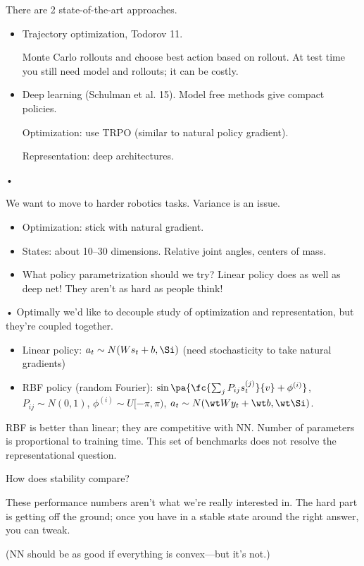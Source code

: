 There are 2 state-of-the-art approaches. 
\begin{itemize}
\item
Trajectory optimization, Todorov 11.

Monte Carlo rollouts and choose best action based on  rollout. At test time you still need model and rollouts; it can be costly.
\item
Deep learning (Schulman et al. 15). Model free methods give compact policies.

Optimization: use TRPO (similar to natural policy gradient).

Representation: deep architectures.
\end{itemize}•

We want to move to harder robotics tasks. Variance is an issue.
\begin{itemize}
\item
Optimization: stick with natural gradient.
\item
States: about 10--30 dimensions. Relative joint angles, centers of mass.
\item
What policy parametrization should we try? Linear policy does as well as deep net! They aren't as hard as people think!
\end{itemize}•
Optimally we'd like to decouple study of optimization and representation, but they're coupled together.

\begin{itemize}
\item
Linear policy: $a_t\sim N(Ws_t+b, \Si)$ (need stochasticity to take natural gradients)
\item
RBF policy (random Fourier): $\sin \pa{\fc{\sum_j P_{ij}s_t^{(j)}}{v} + \phi^{(i)}}$, $P_{ij}\sim N(0,1)$, $\phi^{(i)} \sim U[-\pi, \pi)$,  $a_t\sim N(\wt W y_t+\wt b, \wt \Si)$. 
\end{itemize}
RBF is better than linear; they are competitive with NN. Number of parameters is proportional to training time.  This set of benchmarks does not resolve the representational question.

How does stability compare?

These performance numbers aren't what we're really interested in. The hard part is getting off the ground; once you have in a stable state around the right answer, you can tweak.

(NN should be as good if everything is convex---but it's not.)


